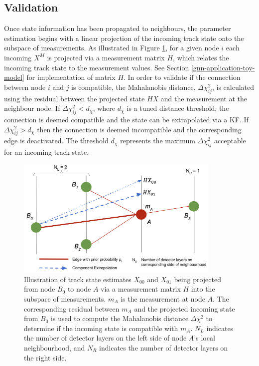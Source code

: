 \subsection{Validation}
Once state information has been propagated to neighbours, the parameter estimation begins with a linear projection of the incoming track state onto the subspace of measurements. As illustrated in Figure \ref{fig:extrapolation}, for a given node $i$ each incoming $X^M$ is projected via a measurement matrix $H$, which relates the incoming track state to the measurement values. See Section \ref{gnn-application-toy-model} for implementation of matrix $H$. In order to validate if the connection between node $i$ and $j$ is compatible, the Mahalanobis distance, $\Delta \chi^{2}_{ij}$, is calculated using the residual between the projected state $HX$ and the measurement at the neighbour node. If $\Delta \chi^{2}_{ij} < d_{\chi}$, where $d_{\chi}$ is a tuned distance threshold, the connection is deemed compatible and the state can be extrapolated via a KF. If $\Delta \chi^{2}_{ij} > d_{\chi}$ then the connection is deemed incompatible and the corresponding edge is deactivated. The threshold $d_{\chi}$ represents the maximum $\Delta \chi^{2}_{ij}$ acceptable for an incoming track state.

\begin{figure}[htbp]
        \centering
        \includegraphics[width=0.87\textwidth]{images/5-gnn-algorithm/gnn-extrapolation.png}
        \caption{Illustration of track state estimates $X_{00}$ and $X_{01}$ being projected from node $B_0$ to node $A$ via a measurement matrix $H$ into the subspace of measurements. $m_A$ is the measurement at node $A$. The corresponding residual between $m_A$ and the projected incoming state from $B_0$ is used to compute the Mahalanobis distance $\Delta \chi^{2}$ to determine if the incoming state is compatible with $m_A$. $N_L$ indicates the number of detector layers on the left side of node $A$'s local neighbourhood, and $N_R$ indicates the number of detector layers on the right side.}
        \label{fig:extrapolation}%
\end{figure}



